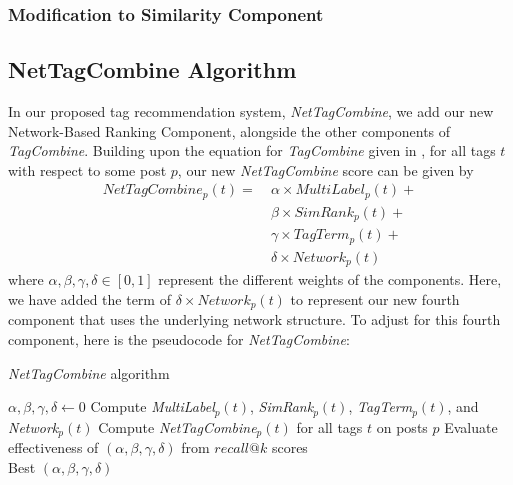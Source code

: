 \documentclass[10pt]{IEEEtran}
\begin{document}
\subsubsection{Modification to Similarity Component}

\subsection{NetTagCombine Algorithm}

In our proposed tag recommendation system, \textit{NetTagCombine}, we add our new Network-Based Ranking Component, alongside the other components of \textit{TagCombine}. Building upon the equation for \textit{TagCombine} given in \cite{1}, for all tags $t$ with respect to some post $p$, our new \textit{NetTagCombine} score can be given by
\begin{align*}
NetTagCombine_p(t) =\ &\alpha \times MultiLabel_p(t) +\\
&\beta \times SimRank_p(t) +\\
&\gamma \times TagTerm_p(t) +\\
&\delta \times Network_p(t)
\end{align*}
where $\alpha,\beta,\gamma,\delta \in [0,1]$ represent the different weights of the components. Here, we have added the term of $\delta \times Network_p(t)$ to represent our new fourth component that uses the underlying network structure. To adjust for this fourth component, here is the pseudocode for \textit{NetTagCombine}:


\begin{algorithm*}
  \caption{\textit{NetTagCombine} algorithm}\label{ntc}
  \begin{algorithmic}[1]
    \State $\alpha, \beta, \gamma, \delta \gets 0$
        \State Compute \textit{MultiLabel}$_p(t)$, \textit{SimRank}$_p(t)$, \textit{TagTerm}$_p(t)$, and \textit{Network$_p(t)$}
      \EndFor
    \EndFor
            \State Compute \textit{NetTagCombine}$_p(t)$ for all tags $t$ on posts $p$
            \State Evaluate effectiveness of $(\alpha,\beta,\gamma,\delta)$ from $recall@k$ scores
          \EndFor
        \EndFor
      \EndFor
    \EndFor\\
    \Return Best $(\alpha,\beta,\gamma,\delta)$\;
  \end{algorithmic}
\end{algorithm*}
\end{document}
